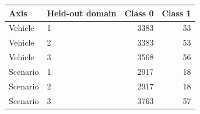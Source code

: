 \par\medskip
\begin{singlespace}\small
\noindent\begin{minipage}{\linewidth}
\centering
{}
\begin{tabular}{@{}l l r r@{}}
\toprule Axis & Held-out domain & Class 0 & Class 1 \\
\midrule
Vehicle & 1 & 3383 & 53 \\
Vehicle & 2 & 3383 & 53 \\
Vehicle & 3 & 3568 & 56 \\
Scenario & 1 & 2917 & 18 \\
Scenario & 2 & 2917 & 18 \\
Scenario & 3 & 3763 & 57 \\
\bottomrule\end{tabular}
\end{minipage}
\end{singlespace}
\par\medskip
\par\medskip
